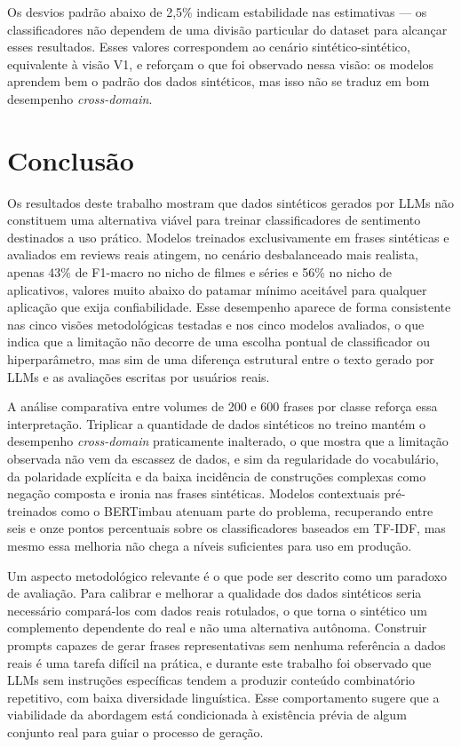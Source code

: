\documentclass[12pt]{article}
\begin{document}
Os desvios padrão abaixo de 2,5\% indicam estabilidade nas estimativas — os classificadores não dependem de uma divisão particular do dataset para alcançar esses resultados. Esses valores correspondem ao cenário sintético-sintético, equivalente à visão V1, e reforçam o que foi observado nessa visão: os modelos aprendem bem o padrão dos dados sintéticos, mas isso não se traduz em bom desempenho \textit{cross-domain}.



\section{Conclusão}
\label{sec:conclusao}

Os resultados deste trabalho mostram que dados sintéticos gerados por LLMs não constituem uma alternativa viável para treinar classificadores de sentimento destinados a uso prático. Modelos treinados exclusivamente em frases sintéticas e avaliados em reviews reais atingem, no cenário desbalanceado mais realista, apenas 43\% de F1-macro no nicho de filmes e séries e 56\% no nicho de aplicativos, valores muito abaixo do patamar mínimo aceitável para qualquer aplicação que exija confiabilidade. Esse desempenho aparece de forma consistente nas cinco visões metodológicas testadas e nos cinco modelos avaliados, o que indica que a limitação não decorre de uma escolha pontual de classificador ou hiperparâmetro, mas sim de uma diferença estrutural entre o texto gerado por LLMs e as avaliações escritas por usuários reais.

A análise comparativa entre volumes de 200 e 600 frases por classe reforça essa interpretação. Triplicar a quantidade de dados sintéticos no treino mantém o desempenho \textit{cross-domain} praticamente inalterado, o que mostra que a limitação observada não vem da escassez de dados, e sim da regularidade do vocabulário, da polaridade explícita e da baixa incidência de construções complexas como negação composta e ironia nas frases sintéticas. Modelos contextuais pré-treinados como o BERTimbau atenuam parte do problema, recuperando entre seis e onze pontos percentuais sobre os classificadores baseados em TF-IDF, mas mesmo essa melhoria não chega a níveis suficientes para uso em produção.

Um aspecto metodológico relevante é o que pode ser descrito como um paradoxo de avaliação. Para calibrar e melhorar a qualidade dos dados sintéticos seria necessário compará-los com dados reais rotulados, o que torna o sintético um complemento dependente do real e não uma alternativa autônoma. Construir prompts capazes de gerar frases representativas sem nenhuma referência a dados reais é uma tarefa difícil na prática, e durante este trabalho foi observado que LLMs sem instruções específicas tendem a produzir conteúdo combinatório repetitivo, com baixa diversidade linguística. Esse comportamento sugere que a viabilidade da abordagem está condicionada à existência prévia de algum conjunto real para guiar o processo de geração.
\end{document}
